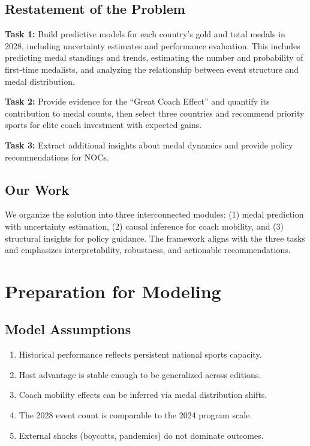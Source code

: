\documentclass{mcmthesis}
\begin{document}
\subsection{Restatement of the Problem}
\textbf{Task 1:} Build predictive models for each country's gold and total medals in 2028, including uncertainty estimates and performance evaluation. This includes predicting medal standings and trends, estimating the number and probability of first-time medalists, and analyzing the relationship between event structure and medal distribution.

\textbf{Task 2:} Provide evidence for the ``Great Coach Effect'' and quantify its contribution to medal counts, then select three countries and recommend priority sports for elite coach investment with expected gains.

\textbf{Task 3:} Extract additional insights about medal dynamics and provide policy recommendations for NOCs.

\subsection{Our Work}
We organize the solution into three interconnected modules: (1) medal prediction with uncertainty estimation, (2) causal inference for coach mobility, and (3) structural insights for policy guidance. The framework aligns with the three tasks and emphasizes interpretability, robustness, and actionable recommendations.

\section{Preparation for Modeling}
\subsection{Model Assumptions}
\begin{enumerate}
    \item Historical performance reflects persistent national sports capacity.
    \item Host advantage is stable enough to be generalized across editions.
    \item Coach mobility effects can be inferred via medal distribution shifts.
    \item The 2028 event count is comparable to the 2024 program scale.
    \item External shocks (boycotts, pandemics) do not dominate outcomes.
\end{enumerate}
\end{document}
